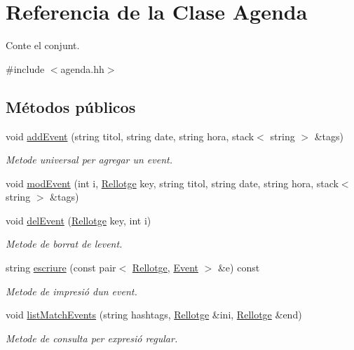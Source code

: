 \hypertarget{class_agenda}{}\section{Referencia de la Clase Agenda}
\label{class_agenda}


Conte el conjunt.  




{\ttfamily \#include $<$agenda.\+hh$>$}

\subsection*{Métodos públicos}
\begin{DoxyCompactItemize}
\item 
void \hyperlink{class_agenda_a2c929acc7e13b65b5a597b94db249c08}{add\+Event} (string titol, string date, string hora, stack$<$ string $>$ \&tags)
\begin{DoxyCompactList}\small\item\em Metode universal per agregar un event. \end{DoxyCompactList}\item 
void \hyperlink{class_agenda_a62f873231c3a2de8867a1901065ba3d3}{mod\+Event} (int i, \hyperlink{class_rellotge}{Rellotge} key, string titol, string date, string hora, stack$<$ string $>$ \&tags)
\item 
void \hyperlink{class_agenda_a2420c913f02af745ffbd455428ddbc18}{del\+Event} (\hyperlink{class_rellotge}{Rellotge} key, int i)
\begin{DoxyCompactList}\small\item\em Metode de borrat de l\textquotesingle{}event. \end{DoxyCompactList}\item 
string \hyperlink{class_agenda_abed56cab5f55439b60937448cc65dabd}{escriure} (const pair$<$ \hyperlink{class_rellotge}{Rellotge}, \hyperlink{class_event}{Event} $>$ \&e) const 
\begin{DoxyCompactList}\small\item\em Metode de impresió d\textquotesingle{}un event. \end{DoxyCompactList}\item 
void \hyperlink{class_agenda_a79f0deb9f644e512b2b143fd60b1bcd5}{list\+Match\+Events} (string hashtags, \hyperlink{class_rellotge}{Rellotge} \&ini, \hyperlink{class_rellotge}{Rellotge} \&end)
\begin{DoxyCompactList}\small\item\em Metode de consulta per expresió regular. \end{DoxyCompactList}\item 

\end{DoxyCompactItemize}
